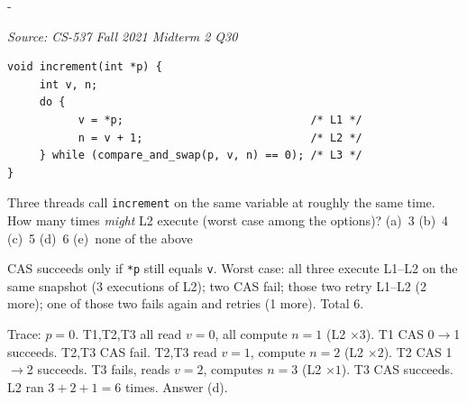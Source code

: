 \documentclass[11pt,a4paper]{article}
\makeatletter
\newcommand{\keepspace}[1]{\par\penalty-100\begingroup
  \setlength{\dimen@}{#1}\dimen@ii\pagegoal\advance\dimen@ii-\pagetotal
  \ifdim\dimen@>\dimen@ii\ifdim\dimen@ii>\z@\vfil\fi\break\fi\endgroup}
\newcounter{qn}[section]
\newenvironment{Qn}[4]{%
  \refstepcounter{qn}\keepspace{7\baselineskip}%
  \begin{tcolorbox}[qboxstyle, title={Q\thesection.\theqn\ \ [#1 \textbar\ #2]\ \ #4}]%
  {\footnotesize\color{g3}\textit{Source: #3}}\par\smallskip%
}{%
  \end{tcolorbox}%
}
\newenvironment{Sol}{%
  \begin{tcolorbox}[sboxstyle, title={Solution}]%
}{%
  \end{tcolorbox}\vspace{0.35em}%
}
\makeatother
\begin{document}
\begin{Qn}{Hard}{Lect 17}{CS-537 Fall 2021 Midterm 2 Q30}{CAS increment: how many times can L2 run?}
\begin{lstlisting}[numbers=none]
void increment(int *p) {
     int v, n;
     do {
           v = *p;                             /* L1 */
           n = v + 1;                          /* L2 */
     } while (compare_and_swap(p, v, n) == 0); /* L3 */
}
\end{lstlisting}

Three threads call \texttt{increment} on the same variable at roughly the same time. How many times \emph{might} L2 execute (worst case among the options)?
(a)~3 (b)~4 (c)~5 (d)~6 (e)~none of the above
\end{Qn}
\begin{Sol}
CAS succeeds only if \texttt{*p} still equals \texttt{v}. Worst case: all three execute L1--L2 on the same snapshot (3 executions of L2); two CAS fail; those two retry L1--L2 (2 more); one of those two fails again and retries (1 more). Total 6.

Trace: $p=0$. T1,T2,T3 all read $v=0$, all compute $n=1$ (L2 $\times 3$). T1 CAS 0$\to$1 succeeds. T2,T3 CAS fail. T2,T3 read $v=1$, compute $n=2$ (L2 $\times 2$). T2 CAS 1$\to$2 succeeds. T3 fails, reads $v=2$, computes $n=3$ (L2 $\times 1$). T3 CAS succeeds. L2 ran $3+2+1=6$ times. Answer (d).
\end{Sol}
\end{document}
